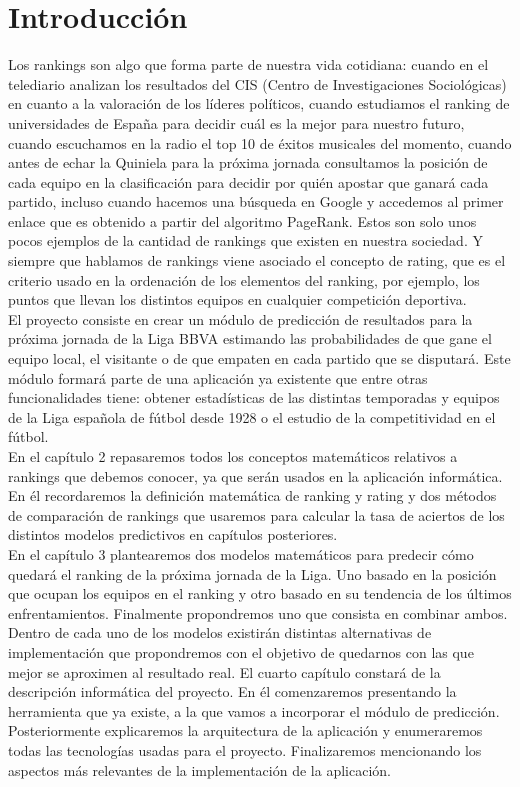 \chapter{Introducción}
Los rankings son algo que forma parte de nuestra vida cotidiana: cuando en el telediario analizan los resultados del CIS (Centro de Investigaciones Sociológicas) en cuanto a la valoración de los líderes políticos, cuando estudiamos el ranking de universidades de España para decidir cuál es la mejor para nuestro futuro, cuando escuchamos en la radio el top 10 de éxitos musicales del momento, cuando antes de echar la Quiniela para la próxima jornada consultamos la posición de cada equipo en la clasificación para decidir por quién apostar que ganará cada partido, incluso cuando hacemos una búsqueda en Google y accedemos al primer enlace que es obtenido a partir del algoritmo PageRank. Estos son solo unos pocos ejemplos de la cantidad de rankings que existen en nuestra sociedad. Y siempre que hablamos de rankings viene asociado el concepto de rating, que es el criterio usado en la ordenación de los elementos del ranking, por ejemplo, los puntos que llevan los distintos equipos en cualquier competición deportiva.\\

El proyecto consiste en crear un módulo de predicción de resultados para la próxima jornada de la Liga BBVA estimando las probabilidades de que gane el equipo local, el visitante o de que empaten en cada partido que se disputará. Este módulo formará parte de una aplicación ya existente que entre otras funcionalidades tiene: obtener estadísticas de las distintas temporadas y equipos de la Liga española de fútbol desde 1928 o el estudio de la competitividad en el fútbol.\\ 

En el capítulo 2 repasaremos todos los conceptos matemáticos relativos a rankings que debemos conocer, ya que serán usados en la aplicación informática.
En él recordaremos la definición matemática de ranking y rating y dos métodos de comparación de rankings que usaremos para calcular la tasa de aciertos de los distintos modelos predictivos en capítulos posteriores.\\ 

En el capítulo 3 plantearemos dos modelos matemáticos para predecir cómo quedará el ranking de la próxima jornada de la Liga. Uno basado en la posición que ocupan los equipos en el ranking y otro basado en su tendencia de los últimos enfrentamientos. Finalmente propondremos uno que consista en combinar ambos. Dentro de cada uno de los modelos existirán distintas alternativas de implementación que propondremos con el objetivo de quedarnos con las que mejor se aproximen al resultado real. 
\newpage
El cuarto capítulo constará de la descripción informática del proyecto. En él comenzaremos presentando la herramienta que ya existe, a la que vamos a incorporar el  módulo de predicción. Posteriormente explicaremos la arquitectura de la aplicación y enumeraremos todas las tecnologías usadas para el proyecto. Finalizaremos mencionando los aspectos más relevantes de la implementación de la aplicación.\\

